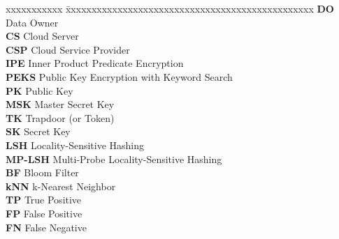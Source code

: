 \documentclass[BTech]{iiitdmdiss}
\begin{document}
\begin{singlespace}
\tableofcontents
\thispagestyle{empty}

\end{singlespace}


\abbreviations

\noindent 
\begin{tabbing}
xxxxxxxxxxx \= xxxxxxxxxxxxxxxxxxxxxxxxxxxxxxxxxxxxxxxxxxxxxxxx \kill
\textbf{DO} \> Data Owner\\
\textbf{CS} \> Cloud Server\\
\textbf{CSP} \> Cloud Service Provider\\
\textbf{IPE} \> Inner Product Predicate Encryption\\
\textbf{PEKS} \> Public Key Encryption with Keyword Search\\
\textbf{PK} \> Public Key\\
\textbf{MSK} \> Master Secret Key\\
\textbf{TK} \> Trapdoor (or Token)\\
\textbf{SK} \> Secret Key\\
\textbf{LSH} \> Locality-Sensitive Hashing\\
\textbf{MP-LSH} \> Multi-Probe Locality-Sensitive Hashing\\
\textbf{BF} \> Bloom Filter\\
\textbf{kNN} \> k-Nearest Neighbor\\
\textbf{TP} \> True Positive\\
\textbf{FP} \> False Positive\\
\textbf{FN} \> False Negative\\
\end{tabbing}

\pagebreak

\end{document}
